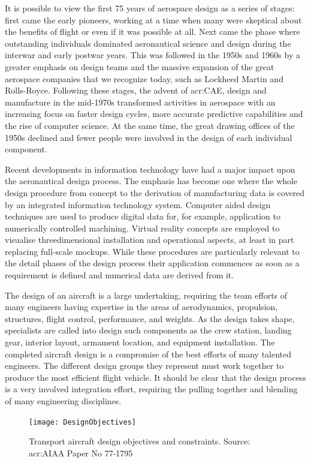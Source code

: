 \noindent
It is possible to view the first 75 years of aerospace design as a series of stages: first came the early pioneers, working at a time when many were skeptical about the benefits of flight or even if it was possible at all. Next came the phase where outstanding individuals dominated aeronautical science and design during the interwar and early postwar years. This was followed in the 1950s and 1960s by a greater emphasis on design teams and the massive expansion of the great aerospace companies that we recognize today, such as Lockheed Martin and Rolls-Royce. Following these stages, the advent of \gls{acr:CAE}, design and  manufacture in the mid-1970s transformed activities in aerospace with an increasing focus on faster design cycles, more accurate predictive capabilities and the rise of computer science. At the same time, the great drawing offices of the 1950s declined and fewer people were involved in the design of each individual component.\cite{gambardella}

\bigskip
\noindent
Recent developments in information technology have had a major impact upon the aeronautical design process. The emphasis has become one where the whole design procedure from concept to the derivation of manufacturing data is covered by an integrated information technology system. Computer aided design techniques are used to produce digital data for, for example, application to numerically controlled machining. Virtual reality concepts are employed to visualise threedimensional installation and operational aspects, at least in part replacing full-scale mockups. While these procedures are particularly relevant to the detail phases of the design process their application commences as soon as a requirement is defined and numerical data are derived from it.\cite{howe2000aircraft}

\bigskip
\noindent
The design of an aircraft is a large undertaking, requiring the team efforts of many engineers having expertise in the areas of aerodynamics, propulsion, structures, flight control, performance, and weights. As the design takes shape, specialists are called into design such components as the crew station, landing gear, interior layout, armament location, and equipment installation. The completed aircraft design is a compromise of the best efforts of many talented engineers. The different design groups they represent must work together to produce the most efficient flight vehicle. It should be clear that the design process is a very involved integration effort, requiring the pulling together and blending of many engineering disciplines.\cite{nicolai2010fundamentals}
%
\begin{figure}[!t]
\centering
\texttt{[image: DesignObjectives]}
\caption{Transport aircraft design objectives and constraints. Source: \gls{acr:AIAA} Paper No 77-1795}
\label{fig:DesignObjectives}
\end{figure}

